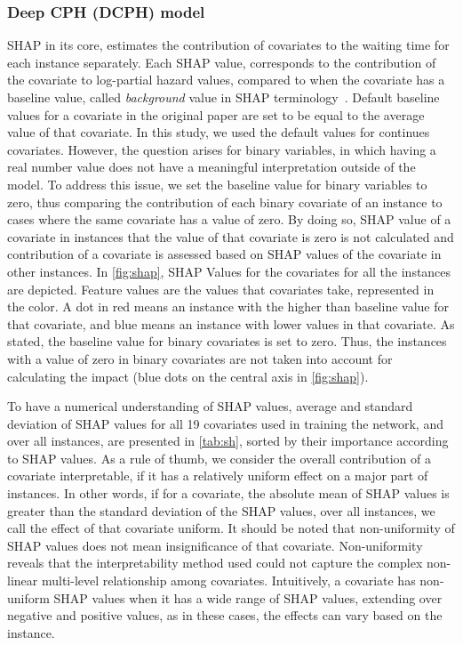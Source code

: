 \subsubsection{Deep CPH (DCPH) model}
SHAP in its core, estimates the contribution of covariates to the waiting time for each instance separately. Each SHAP value, corresponds to the contribution of the covariate to log-partial hazard values, compared to when the covariate has a baseline value, called \textit{background} value in SHAP terminology~\citep{molnar2019interpretable}. Default baseline values for a covariate in the original paper are set to be equal to the average value of that covariate. In this study, we used the default values for continues covariates. However, the question arises for binary variables, in which having a real number value does not have a meaningful interpretation outside of the model. To address this issue, we set the baseline value for binary variables to zero, thus comparing the contribution of each binary covariate of an instance to cases where the same covariate has a value of zero. By doing so, SHAP value of a covariate in instances that the value of that covariate is zero is not calculated and contribution of a covariate is assessed based on SHAP values of the covariate in other instances. In \cref{fig:shap}, SHAP Values for the covariates for all the instances are depicted. Feature values are the values that covariates take, represented in the color. A dot in red means an instance with the higher than baseline value for that covariate, and blue means an instance with lower values in that covariate. As stated, the baseline value for binary covariates is set to zero. Thus, the instances with a value of zero in binary covariates are not taken into account for calculating the impact (blue dots on the central axis in \cref{fig:shap}).

To have a numerical understanding of SHAP values, average and standard deviation of SHAP values for all 19 covariates used in training the network, and over all instances, are presented in \cref{tab:sh}, sorted by their importance according to SHAP values. As a rule of thumb, we consider the overall contribution of a covariate interpretable, if it has a relatively uniform effect on a major part of instances. In other words, if for a covariate, the absolute mean of SHAP values is greater than the standard deviation of the SHAP values, over all instances, we call the effect of that covariate uniform. It should be noted that non-uniformity of SHAP values does not mean insignificance of that covariate. Non-uniformity reveals that the interpretability method used could not capture the complex non-linear multi-level relationship among covariates. Intuitively, a covariate has non-uniform SHAP values when it has a wide range of SHAP values, extending over negative and positive values, as in these cases, the effects can vary based on the instance. 

